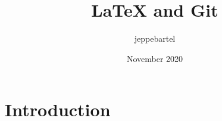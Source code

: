 \documentclass{article}
\title{LaTeX and Git}
\author{jeppebartel}
\date{November 2020}
\begin{document}
\maketitle

\section{Introduction}
\end{document}
